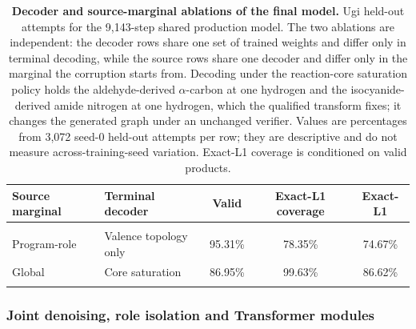 \documentclass{article}
\theoremstyle{definition}
\newcommand{\ForgeProseAttemptsPerProgram}{3{,}072}
\begin{document}
\begin{table}[htbp]
\caption{\textbf{Decoder and source-marginal ablations of the final model.} Ugi held-out attempts
for the 9,143-step shared production model. The two
ablations are independent: the decoder rows share one set of trained weights and differ only in
terminal decoding, while the source rows share one decoder and differ only in the marginal the
corruption starts from. Decoding under the reaction-core saturation policy holds the aldehyde-derived
$\alpha$-carbon at one hydrogen and the isocyanide-derived amide nitrogen at one hydrogen, which the
qualified transform fixes; it changes the generated graph under an unchanged verifier. Values
are percentages from \ForgeProseAttemptsPerProgram{} seed-0 held-out attempts per row; they are descriptive and do not measure
across-training-seed variation. Exact-L1 coverage is conditioned on valid products.}
\label{tab:decoder-source-ablation}
\centering
\scriptsize
\setlength{\tabcolsep}{5pt}
\begin{tabular}{@{}llccc@{}}
\toprule
Source marginal & Terminal decoder & Valid & Exact-L1 coverage & Exact-L1 \\
\midrule
\cellcolor{forgerow}{Program-role} & \cellcolor{forgerow}{Core saturation} & \cellcolor{forgerow}{95.21\%} & \cellcolor{forgerow}{99.90\%} & \cellcolor{forgerow}{95.12\%} \\
Program-role & Valence topology only & 95.31\% & 78.35\% & 74.67\% \\
Global & Core saturation & 86.95\% & 99.63\% & 86.62\% \\
\bottomrule
\relax{}\end{tabular}
\end{table}

\subsubsection{Joint denoising, role isolation and Transformer modules}
\end{document}
